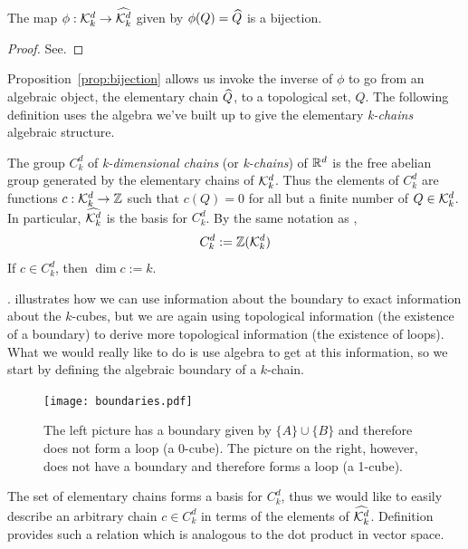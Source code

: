 \begin{prop} \label{prop:bijection}
	The map $\phi : \mathcal{K}^{d}_k \rightarrow \widehat{\mathcal{K}^{d}_k}$ given by $\phi(Q) = \widehat{Q}$ is a bijection.
\end{prop}
%
\begin{proof}
	See.
\end{proof}

Proposition~\ref{prop:bijection} allows us invoke the inverse of $\phi$ to go from an algebraic object, the elementary chain $\widehat{Q}$, to a topological set, $Q$. The following definition uses the algebra we've built up to give the elementary \textit{k-chains} algebraic structure.

\begin{defn}
	The group $C_k^d$ of \textit{k-dimensional chains} (or \textit{k-chains}) of $\mathbb{R}^d$ is the free abelian group generated by the elementary chains of $\mathcal{K}^{d}_k$. Thus the elements of $C_k^d$ are functions $c : \mathcal{K}^{d}_k \rightarrow \mathbb{Z}$ such that $c(Q) = 0$ for all but a finite number of $Q \in \mathcal{K}^{d}_k$. In particular, $\widehat{\mathcal{K}^{d}_k}$ is the basis for $C_k^d$. By the same notation as ,
	$$ C_k^d := \mathbb{Z}(\mathcal{K}^{d}_k) $$
	If $ c \in C_k^d$, then $\dim c := k$.
\end{defn}

.  illustrates how we can use information about the boundary to exact information about the $k$-cubes, but we are again using topological information (the existence of a boundary) to derive more topological information (the existence of loops). What we would really like to do is use algebra to get at this information, so we start by defining the algebraic boundary of a $k$-chain.

\begin{figure}[h]
\begin{center}
\texttt{[image: boundaries.pdf]}
\caption{\label{fig:boundaries} The left picture has a boundary given by $\{ A \} \cup \{ B \}$ and therefore does not form a loop (a 0-cube). The picture on the right, however, does not have a boundary and therefore forms a loop (a 1-cube).}
\end{center}
\end{figure}

The set of elementary chains forms a basis for $C_k^d$, thus we would like to easily describe an arbitrary chain $c \in C_k^d$ in terms of the elements of $\widehat{\mathcal{K}^{d}_k}$. Definition  provides such a relation which is analogous to the dot product in vector space.

